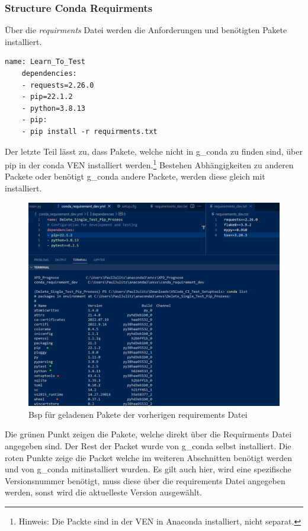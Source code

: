 \subsubsection{Structure Conda Requirments} Über die \textit{requirments} Datei werden die Anforderungen und benötigten Pakete installiert. 

\begin{lstlisting}[style=Config, caption={Beispiel Conda-Requirmentsdatei}, captionpos=b]
	name: Learn_To_Test
	dependencies:
	- requests=2.26.0
	- pip=22.1.2
	- python=3.8.13
	- pip:
	- pip install -r requirments.txt
\end{lstlisting}
Der letzte Teil lässt zu, dass Pakete, welche nicht in \gls{g_conda} zu finden sind, über pip in der conda \gls{VEN} installiert werden.\footnote{Hinweis: Die Packte sind in der \gls{VEN} in Anaconda installiert, nicht separat.} Bestehen Abhängigkeiten zu anderen Packete oder benötigt \gls{g_conda} andere Packete, werden diese gleich mit installiert. 

\begin{figure}[H]
	\centering
	\includegraphics[scale = 0.2]{attachment/chapter_2/Scc084}
	\caption{Bsp für geladenen Pakete der vorherigen requirements Datei}
\end{figure}

Die grünen Punkt zeigen die Pakete, welche direkt über die Requirments Datei angegeben sind. Der Rest der Packet wurde von \gls{g_conda} selbst installiert. Die roten Punkte zeige die Packet welche im weiteren Abschnitten benötigt werden und von \gls{g_conda} mitinstalliert wurden. Es gilt auch hier, wird eine spezifische Versionsnummer benötigt, muss diese über die requirements Datei angegeben werden, sonst wird die aktuelleste Version ausgewählt.\\

